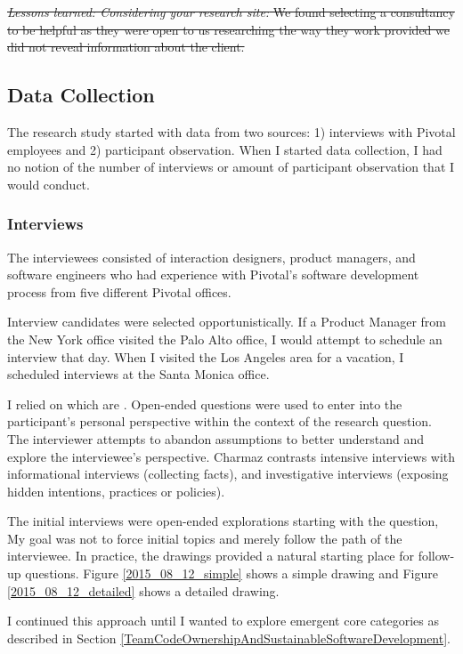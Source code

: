 \sout{\textit{Lessons learned: Considering your research site:} We found selecting a consultancy to be helpful as they were open to us researching the way they work provided we did not reveal information about the client.}
\subsection{Data Collection}
The research study started with data from two sources: 1) interviews with Pivotal employees and 2) participant observation. When I started data collection, I had no notion of the number of interviews or amount of participant observation that I would conduct. 
\subsubsection{Interviews}
The interviewees consisted of \numberOfInterviews{} interaction designers, product managers, and software engineers who had experience with Pivotal's software development process from five different Pivotal offices. 

Interview candidates were selected opportunistically. If a Product Manager from the New York office visited the Palo Alto office, I would attempt to schedule an interview that day. When I visited the Los Angeles area for a vacation, I scheduled interviews at the Santa Monica office.

I relied on  which are  \cite{Charmaz}. Open-ended questions were used to enter into the participant's personal perspective within the context of the research question. The interviewer attempts to abandon assumptions to better understand and explore the interviewee's perspective. Charmaz \cite{Charmaz} contrasts intensive interviews with informational interviews (collecting facts), and investigative interviews (exposing hidden intentions, practices or policies).

The initial interviews were open-ended explorations starting with the question,  My goal was not to force initial topics and merely follow the path of the interviewee. In practice, the drawings provided a natural starting place for follow-up questions. Figure \ref{2015_08_12_simple} shows a simple drawing and Figure \ref{2015_08_12_detailed} shows a detailed drawing. 

I continued this approach until I wanted to explore emergent core categories as described in Section \ref{TeamCodeOwnershipAndSustainableSoftwareDevelopment}.

